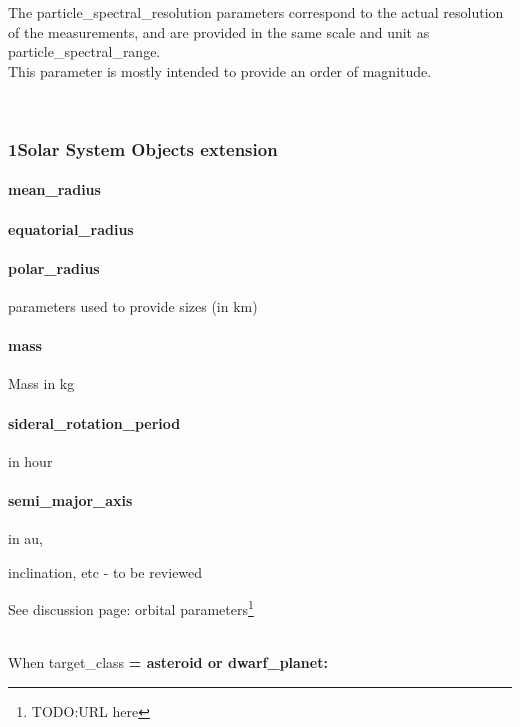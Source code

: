 \documentclass[11pt,a4paper]{ivoa}
\begin{document}
The particle\_spectral\_resolution parameters correspond to the actual resolution of the measurements, and are provided in the same scale and unit as particle\_spectral\_range. \\ This parameter is mostly intended to provide an order of magnitude.

 

\subsubsection{1Solar System Objects extension\\}

\paragraph{mean\_radius}

\paragraph{equatorial\_radius}

\paragraph{polar\_radius}

parameters used to provide sizes (in km)\\

\paragraph{mass}

Mass in kg

\paragraph{sideral\_rotation\_period}

in hour\\

\paragraph{semi\_major\_axis}

in au,

inclination, etc - to be reviewed

See discussion page: orbital parameters\footnote{TODO:URL here}

\\When target\_class\textbf{ = asteroid or dwarf\_planet:\\}
\end{document}
